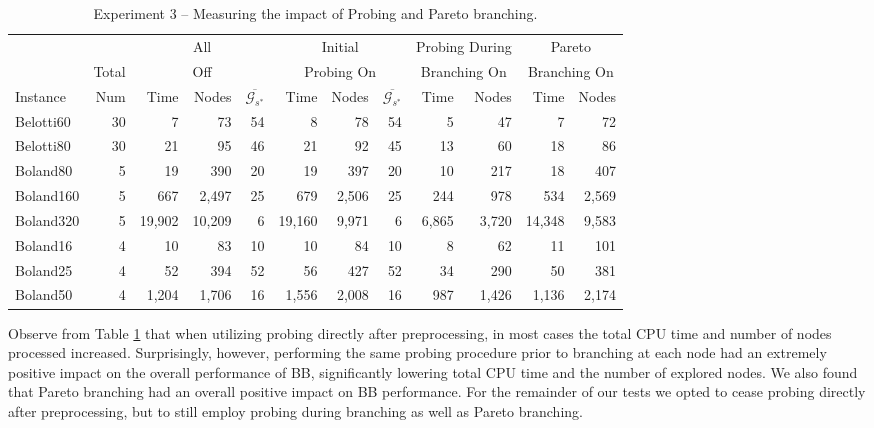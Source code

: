 \documentclass[11.5pt]{article}
\begin{document}
 \begin{table}%
\centering
\caption{Experiment 3 -- Measuring the impact of Probing and Pareto branching.}\label{table_probing}
\begin{tabular}{l|r|rrr|rrr|rr|rr}
\toprule
 &  & \multicolumn{3}{c}{All} & \multicolumn{3}{c}{Initial} & \multicolumn{2}{c}{Probing During} & \multicolumn{2}{c}{Pareto}\\ 
  & Total & \multicolumn{3}{c}{Off} & \multicolumn{3}{c}{Probing On} & \multicolumn{2}{c}{Branching On} & \multicolumn{2}{c}{Branching On}\\
\cmidrule(r){3-5}
\cmidrule(r){6-8}
\cmidrule(r){9-10}
\cmidrule(r){11-12}
Instance & Num & Time & Nodes & $\overline{\mathcal{G}_{s^*}}$ & Time & Nodes & $\overline{\mathcal{G}_{s^*}}$ & Time & Nodes & Time & Nodes  \\ 
\midrule
Belotti60 & 30 & 7 & 73 & 54 & 8  & 78 & 54 & 5 & 47 & 7 & 72\\
Belotti80 & 30 & 21 & 95 & 46 & 21 & 92 & 45 & 13 & 60 & 18 & 86\\
\midrule
Boland80 & 5 & 19 & 390 & 20 & 19 & 397 & 20 & 10 & 217 & 18 & 407\\
Boland160 & 5 & 667 & 2,497 & 25 & 679 & 2,506 & 25 & 244 & 978 & 534 & 2,569\\
Boland320 & 5 & 19,902 & 10,209 & 6 & 19,160 & 9,971 & 6 & 6,865 & 3,720 & 14,348 & 9,583 \\
Boland16 & 4 & 10 & 83 & 10 & 10 & 84 & 10 & 8 & 62 & 11 & 101 \\
Boland25 & 4 & 52 & 394 & 52 & 56 & 427 & 52 & 34 & 290 & 50 & 381\\
Boland50 & 4 & 1,204 & 1,706 & 16 & 1,556 & 2,008 & 16 & 987 & 1,426 & 1,136 & 2,174  \\
\bottomrule
\end{tabular}
\end{table}

Observe from Table \ref{table_probing} that when utilizing probing directly after preprocessing, in most cases the total CPU time and number of nodes processed increased. Surprisingly, however, performing the same probing procedure prior to branching at each node had an extremely positive impact on the overall performance of BB, significantly lowering total CPU time and the number of explored nodes. We also found that Pareto branching had an overall positive impact on BB performance. For the remainder of our tests we opted to cease probing directly after preprocessing, but to still employ probing during branching as well as Pareto branching. 
\end{document}
